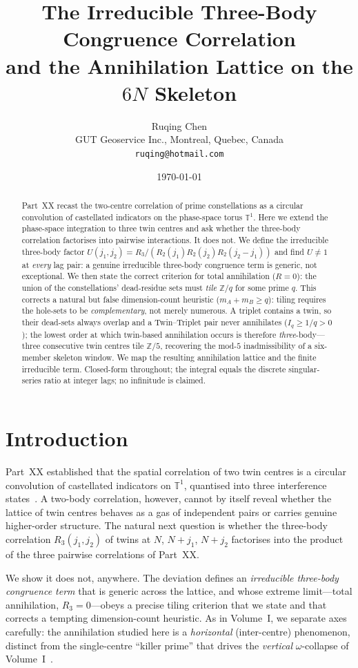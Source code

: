 \documentclass[11pt,a4paper]{article}
\title{\Large \textbf{The Irreducible Three-Body Congruence Correlation\\
and the Annihilation Lattice on the $6N$ Skeleton}}
\author{Ruqing Chen\\
\small GUT Geoservice Inc., Montreal, Quebec, Canada\\
\small \texttt{ruqing@hotmail.com}}
\date{\today}
\begin{document}
\maketitle

\begin{abstract}
Part~XX recast the two-centre correlation of prime constellations as a circular
convolution of castellated indicators on the phase-space torus $\mathbb{T}^1$.
Here we extend the phase-space integration to three twin centres and ask whether
the three-body correlation factorises into pairwise interactions. It does not. We
define the irreducible three-body factor $U(j_1,j_2)=R_3/(R_2(j_1)R_2(j_2)
R_2(j_2-j_1))$ and find $U\neq1$ at \emph{every} lag pair: a genuine irreducible
three-body congruence term is generic, not exceptional. We then state the correct
criterion for total annihilation ($R=0$): the union of the constellations'
dead-residue sets must \emph{tile} $\mathbb{Z}/q$ for some prime $q$. This
corrects a natural but false dimension-count heuristic ($m_A+m_B\ge q$): tiling
requires the hole-sets to be \emph{complementary}, not merely numerous. A triplet
contains a twin, so their dead-sets always overlap and a Twin--Triplet pair never
annihilates ($I_q\ge1/q>0$); the lowest order at which twin-based annihilation
occurs is therefore \emph{three}-body---three consecutive twin centres tile
$\mathbb{Z}/5$, recovering the mod-$5$ inadmissibility of a six-member skeleton
window. We map the resulting annihilation lattice and the finite irreducible term.
Closed-form throughout; the integral equals the discrete singular-series ratio at
integer lags; no infinitude is claimed.
\end{abstract}

\section{Introduction}
Part~XX established that the spatial correlation of two twin centres is a circular
convolution of castellated indicators on $\mathbb{T}^1$, quantised into three
interference states~\cite{ChenXX}. A two-body correlation, however, cannot by
itself reveal whether the lattice of twin centres behaves as a gas of independent
pairs or carries genuine higher-order structure. The natural next question is
whether the three-body correlation $R_3(j_1,j_2)$ of twins at $N$, $N+j_1$,
$N+j_2$ factorises into the product of the three pairwise correlations of Part~XX.

We show it does not, anywhere. The deviation defines an \emph{irreducible
three-body congruence term} that is generic across the lattice, and whose extreme
limit---total annihilation, $R_3=0$---obeys a precise tiling criterion that we
state and that corrects a tempting dimension-count heuristic. As in Volume~I, we
separate axes carefully: the annihilation studied here is a \emph{horizontal}
(inter-centre) phenomenon, distinct from the single-centre ``killer prime'' that
drives the \emph{vertical} $\omega$-collapse of Volume~I~\cite{ChenXVII,Review}.
\end{document}
